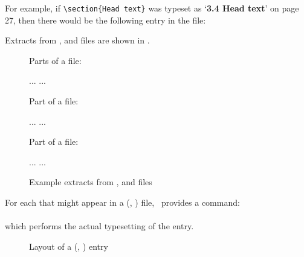     For example, if \verb?\section{Head text}? was typeset as 
`\textbf{3.4 Head text}' on page 27, then there would be the following
entry in the  file:
\begin{lcode}
\end{lcode}
Extracts from ,  and  files are shown in
.

\begin{figure}
\centering
Parts of a  file:
\begin{lcode}
...
...

\end{lcode}

Part of a  file:

\begin{lcode}
...
\addvspace{10pt}
\addvspace{10pt}
...
\end{lcode}

Part of a  file:

\begin{lcode}
...
\addvspace
{}
...
\end{lcode}
\caption{Example extracts from ,  and  files}
\label{fig:tocloflotfiles}
\end{figure}

     For each  that might appear in a  
(, ) file, \ltx\ provides a command: \\
 \cmd{\l@kind} \\
which performs the actual typesetting of the \cmd{\contentsline} entry. 


\begin{figure}
\drawtoc
\caption{Layout of a \prtoc{} (\prlof, \prlot) entry} \label{fig:ltoc}
\end{figure}

